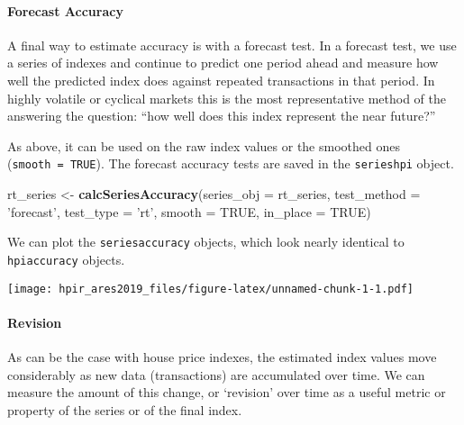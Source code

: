 \documentclass[]{article}
\newenvironment{Shaded}{\begin{snugshade}}{\end{snugshade}}
\newcommand{\DataTypeTok}[1]{\textcolor[rgb]{0.13,0.29,0.53}{#1}}
\newcommand{\KeywordTok}[1]{\textcolor[rgb]{0.13,0.29,0.53}{\textbf{#1}}}
\newcommand{\NormalTok}[1]{#1}
\newcommand{\OperatorTok}[1]{\textcolor[rgb]{0.81,0.36,0.00}{\textbf{#1}}}
\newcommand{\OtherTok}[1]{\textcolor[rgb]{0.56,0.35,0.01}{#1}}
\newcommand{\StringTok}[1]{\textcolor[rgb]{0.31,0.60,0.02}{#1}}
\let\oldparagraph\paragraph
\renewcommand{\paragraph}[1]{\oldparagraph{#1}\mbox{}}
\begin{document}
\hypertarget{forecast-accuracy}{%
\paragraph{Forecast Accuracy}\label{forecast-accuracy}}

A final way to estimate accuracy is with a forecast test. In a forecast
test, we use a series of indexes and continue to predict one period
ahead and measure how well the predicted index does against repeated
transactions in that period. In highly volatile or cyclical markets this
is the most representative method of the answering the question: ``how
well does this index represent the near future?''

As above, it can be used on the raw index values or the smoothed ones
(\texttt{smooth\ =\ TRUE}). The forecast accuracy tests are saved in the
\texttt{serieshpi} object.

\begin{Shaded}
\begin{Highlighting}[]
\NormalTok{  rt_series <-}\StringTok{ }\KeywordTok{calcSeriesAccuracy}\NormalTok{(}\DataTypeTok{series_obj =}\NormalTok{ rt_series,}
                                  \DataTypeTok{test_method =} \StringTok{'forecast'}\NormalTok{,}
                                  \DataTypeTok{test_type =} \StringTok{'rt'}\NormalTok{,}
                                  \DataTypeTok{smooth =} \OtherTok{TRUE}\NormalTok{,}
                                  \DataTypeTok{in_place =} \OtherTok{TRUE}\NormalTok{)}
\end{Highlighting}
\end{Shaded}

We can plot the \texttt{seriesaccuracy} objects, which look nearly
identical to \texttt{hpiaccuracy} objects.

\begin{Shaded}
\end{Shaded}

\texttt{[image: hpir\_ares2019\_files/figure-latex/unnamed-chunk-1-1.pdf]}

\hypertarget{revision}{%
\paragraph{Revision}\label{revision}}

As can be the case with house price indexes, the estimated index values
move considerably as new data (transactions) are accumulated over time.
We can measure the amount of this change, or `revision' over time as a
useful metric or property of the series or of the final index.
\end{document}
